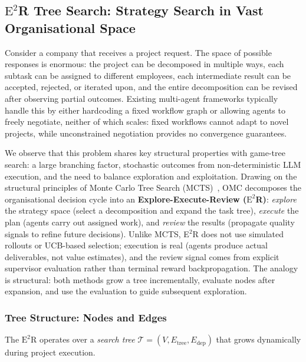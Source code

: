 \documentclass[11pt,a4paper]{article}
\begin{document}
\subsection{$\text{E}^2$R Tree Search: Strategy Search in Vast Organisational Space}
\label{sec:explore-review}

Consider a company that receives a project request. The space of possible responses is enormous: the project can be decomposed in multiple ways, each subtask can be assigned to different employees, each intermediate result can be accepted, rejected, or iterated upon, and the entire decomposition can be revised after observing partial outcomes. Existing multi-agent frameworks typically handle this by either hardcoding a fixed workflow graph or allowing agents to freely negotiate, neither of which scales: fixed workflows cannot adapt to novel projects, while unconstrained negotiation provides no convergence guarantees.

We observe that this problem shares key structural properties with game-tree search: a large branching factor, stochastic outcomes from non-deterministic LLM execution, and the need to balance exploration and exploitation. Drawing on the structural principles of Monte Carlo Tree Search (MCTS)~\cite{kocsis2006bandit}, OMC decomposes the organisational decision cycle into an \textbf{Explore-Execute-Review ($\text{E}^2$R)}: \emph{explore} the strategy space (select a decomposition and expand the task tree), \emph{execute} the plan (agents carry out assigned work), and \emph{review} the results (propagate quality signals to refine future decisions).  Unlike MCTS, E$^2$R does not use simulated rollouts or UCB-based selection; execution is real (agents produce actual deliverables, not value estimates), and the review signal comes from explicit supervisor evaluation rather than terminal reward backpropagation.  The analogy is structural: both methods grow a tree incrementally, evaluate nodes after expansion, and use the evaluation to guide subsequent exploration.

\subsubsection{Tree Structure: Nodes and Edges}

The $\text{E}^2$R operates over a \emph{search tree} $\mathcal{T} = (V, E_{\text{tree}}, E_{\text{dep}})$ that grows dynamically during project execution.
\end{document}
